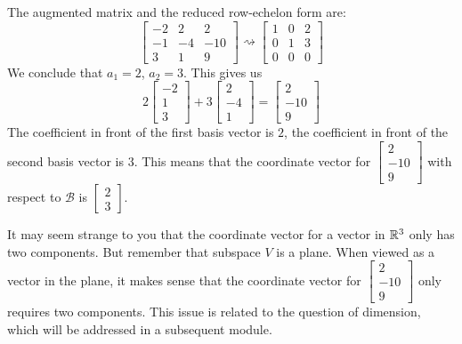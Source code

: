 \documentclass{ximera}
\begin{document}
\begin{example}
\begin{explanation}
 The augmented matrix and the reduced row-echelon form are:
 $$\left[\begin{array}{cc|c}  
 -2&2&2\\-1&-4&-10\\3&1&9
 \end{array}\right]\rightsquigarrow\left[\begin{array}{cc|c}  
 1&0&2\\0&1&3\\0&0&0
 \end{array}\right]$$
 We conclude that $a_1=2$, $a_2=3$.  This gives us
 $$2\begin{bmatrix}-2\\1\\3\end{bmatrix}+3\begin{bmatrix}2\\-4\\1\end{bmatrix}=\begin{bmatrix}2\\-10\\9\end{bmatrix}$$
 The coefficient in front of the first basis vector is $2$, the coefficient in front of the second basis vector is $3$.  This means that the coordinate vector for $\begin{bmatrix}2\\-10\\9\end{bmatrix}$ with respect to $\mathcal{B}$ is $\begin{bmatrix}2\\3\end{bmatrix}$.
 
 It may seem strange to you that the coordinate vector for a vector in $\mathbb{R}^3$ only has two components.  But remember that subspace $V$ is a plane.  When viewed as a vector in the plane, it  makes sense that the coordinate vector for $\begin{bmatrix}2\\-10\\9\end{bmatrix}$ only requires two components.  This issue is related to the question of dimension, which will be addressed in a subsequent module.
\end{explanation}
\end{example}
\end{document}
